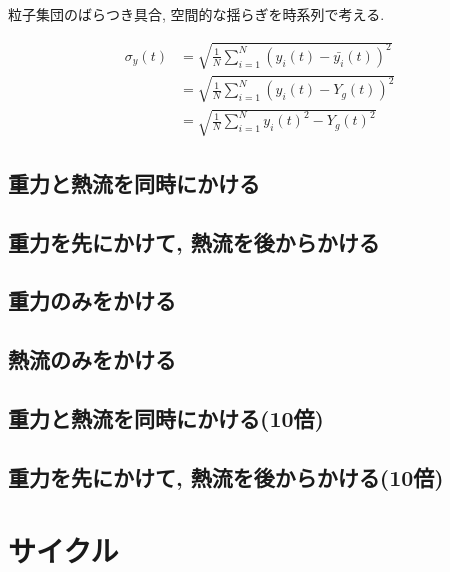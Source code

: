 粒子集団のばらつき具合, 空間的な揺らぎを時系列で考える.

\begin{align}
  \sigma_{y} (t)
  &= \sqrt{\frac{1}{N} \sum_{i=1}^{N} (y_i (t) - \bar{y_i}(t) )^2} \\
  &= \sqrt{\frac{1}{N} \sum_{i=1}^{N} (y_i (t) - Y_g (t) )^2} \\
  &= \sqrt{\frac{1}{N} \sum_{i=1}^{N} {{y_i} (t)}^2 - {{Y_g} (t)}^2}
\end{align}

\subsection{重力と熱流を同時にかける}



\subsection{重力を先にかけて, 熱流を後からかける}



\subsection{重力のみをかける}



\subsection{熱流のみをかける}



\subsection{重力と熱流を同時にかける(10倍)}



\subsection{重力を先にかけて, 熱流を後からかける(10倍)}




\section{サイクル}

